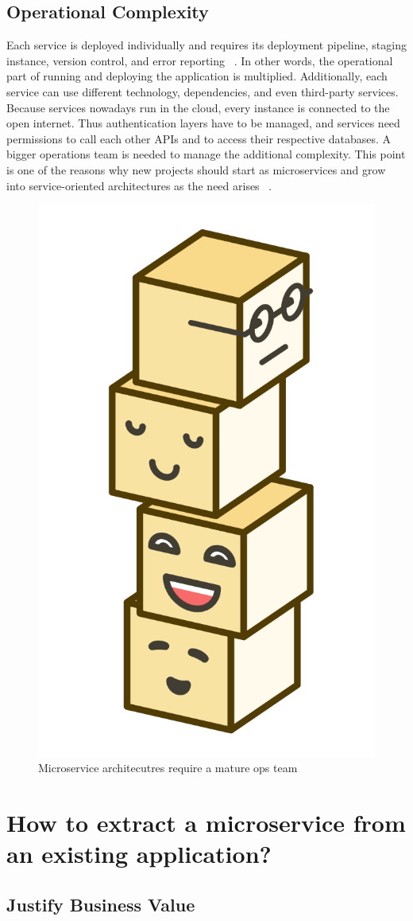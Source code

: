 \subsection{Operational Complexity}
\label{sec:theory:challenges:ops}

Each service is deployed individually and requires its deployment pipeline, staging instance, version control, and error reporting ~\cite{fachat.2019.1}. In other words, the operational part of running and deploying the application is multiplied. Additionally, each service can use different technology, dependencies, and even third-party services. Because services nowadays run in the cloud, every instance is connected to the open internet. Thus authentication layers have to be managed, and services need permissions to call each other APIs and to access their respective databases. A bigger operations team is needed to manage the additional complexity. This point is one of the reasons why new projects should start as microservices and grow into service-oriented architectures as the need arises ~\cite{krivtsov.2019}.

\begin{figure}[ht]
  \centering
  \includegraphics[width=0.25\linewidth]{assets/illustration-microservice-stack.png}
  \caption{Microservice architecutres require a mature ops team}
\end{figure}


\section{How to extract a microservice from an existing application?}

\subsection{Justify Business Value}

